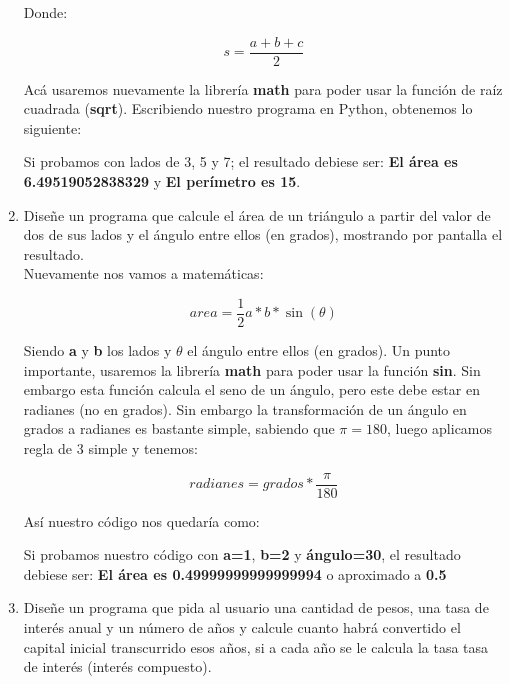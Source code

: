 \begin{enumerate}[{Ejercicio} 1.]
        Donde:

        \[ s = \frac{a + b + c}{2} \]

        Acá usaremos nuevamente la librería \textbf{math} para poder usar la función de raíz cuadrada (\textbf{sqrt}). Escribiendo nuestro programa en Python, obtenemos lo siguiente:

        \begin{listing}[H]
        \end{listing}

        Si probamos con lados de 3, 5 y 7; el resultado debiese ser: \textbf{El área es 6.49519052838329} y \textbf{El perímetro es 15}.

        \item Diseñe un programa que calcule el área de un triángulo a partir del valor de dos de sus lados y el ángulo entre ellos (en grados), mostrando por pantalla el resultado.\\
        
        \asw Nuevamente nos vamos a matemáticas:

        \[ area = \frac{1}{2} a*b*\sin(\theta) \]

        Siendo \textbf{a} y \textbf{b} los lados y \(\theta\) el ángulo entre ellos (en grados). Un punto importante, usaremos la librería \textbf{math} para poder usar la función \textbf{sin}. Sin embargo esta función calcula el seno de un ángulo, pero este debe estar en radianes (no en grados). Sin embargo la transformación de un ángulo en grados a radianes es bastante simple, sabiendo que \(\pi = 180\), luego aplicamos regla de 3 simple y tenemos:

        \[ radianes = grados * \frac{\pi}{180} \]

        Así nuestro código nos quedaría como:

        \begin{listing}[H]
        \end{listing}

        Si probamos nuestro código con \textbf{a=1}, \textbf{b=2} y \textbf{ángulo=30}, el resultado debiese ser: \textbf{El área es 0.49999999999999994} o aproximado a \textbf{0.5}

        \item Diseñe un programa que pida al usuario una cantidad de pesos, una tasa de interés anual y un número de años y calcule cuanto habrá convertido el capital inicial transcurrido esos años, si a cada año se le calcula la tasa tasa de interés (interés compuesto).\\
        

\end{enumerate}
